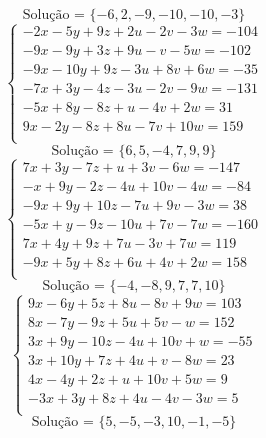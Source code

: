 \documentclass[12pt,oneside,a4paper]{article}
\begin{document}
\begin{equation*}
\text{Solução = }\{-6,2,-9,-10,-10,-3\}
\end{equation*}
\vspace{\baselineskip}
\begin{equation*}
\begin{cases}
-2x-5y+9z+2u-2v-3w=-104 \\
-9x-9y+3z+9u-v-5w=-102 \\
-9x-10y+9z-3u+8v+6w=-35 \\
-7x+3y-4z-3u-2v-9w=-131 \\
-5x+8y-8z+u-4v+2w=31 \\
9x-2y-8z+8u-7v+10w=159 \\
\end{cases}
\end{equation*}
\begin{equation*}
\text{Solução = }\{6,5,-4,7,9,9\}
\end{equation*}
\vspace{\baselineskip}
\begin{equation*}
\begin{cases}
7x+3y-7z+u+3v-6w=-147 \\
-x+9y-2z-4u+10v-4w=-84 \\
-9x+9y+10z-7u+9v-3w=38 \\
-5x+y-9z-10u+7v-7w=-160 \\
7x+4y+9z+7u-3v+7w=119 \\
-9x+5y+8z+6u+4v+2w=158 \\
\end{cases}
\end{equation*}
\begin{equation*}
\text{Solução = }\{-4,-8,9,7,7,10\}
\end{equation*}
\vspace{\baselineskip}
\begin{equation*}
\begin{cases}
9x-6y+5z+8u-8v+9w=103 \\
8x-7y-9z+5u+5v-w=152 \\
3x+9y-10z-4u+10v+w=-55 \\
3x+10y+7z+4u+v-8w=23 \\
4x-4y+2z+u+10v+5w=9 \\
-3x+3y+8z+4u-4v-3w=5 \\
\end{cases}
\end{equation*}
\begin{equation*}
\text{Solução = }\{5,-5,-3,10,-1,-5\}
\end{equation*}
\end{document}
